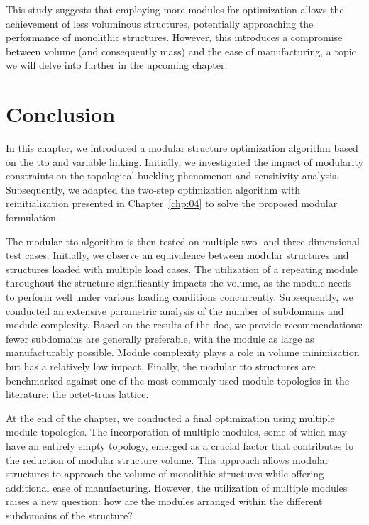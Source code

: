    This study suggests that employing more modules for optimization allows the achievement of less voluminous structures, potentially approaching the performance of monolithic structures. However, this introduces a compromise between volume (and consequently mass) and the ease of manufacturing, a topic we will delve into further in the upcoming chapter.

\section{Conclusion}
In this chapter, we introduced a modular structure optimization algorithm based on the \acrfull{tto} and variable linking. Initially, we investigated the impact of modularity constraints on the topological buckling phenomenon and sensitivity analysis. Subsequently, we adapted the two-step optimization algorithm with reinitialization presented in Chapter~\ref{chp:04} to solve the proposed modular formulation.

The modular \gls{tto} algorithm is then tested on multiple two- and three-dimensional test cases. Initially, we observe an equivalence between modular structures and structures loaded with multiple load cases. The utilization of a repeating module throughout the structure significantly impacts the volume, as the module needs to perform well under various loading conditions concurrently. Subsequently, we conducted an extensive parametric analysis of the number of subdomains and module complexity. Based on the results of the \acrfull{doe}, we provide recommendations: fewer subdomains are generally preferable, with the module as large as manufacturably possible. Module complexity plays a role in volume minimization but has a relatively low impact. Finally, the modular \gls{tto} structures are benchmarked against one of the most commonly used module topologies in the literature: the octet-truss lattice.

At the end of the chapter, we conducted a final optimization using multiple module topologies. The incorporation of multiple modules, some of which may have an entirely empty topology, emerged as a crucial factor that contributes to the reduction of modular structure volume. This approach allows modular structures to approach the volume of monolithic structures while offering additional ease of manufacturing. However, the utilization of multiple modules raises a new question: how are the modules arranged within the different subdomains of the structure?
